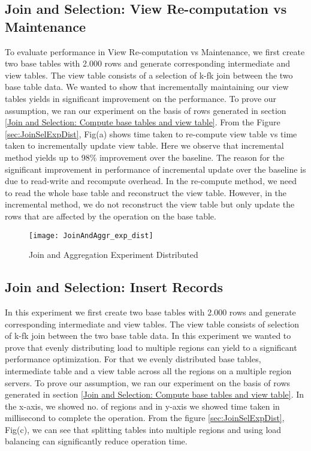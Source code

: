 \documentclass[11pt,a4paper,bibtotoc,idxtotoc,headsepline,footsepline,footexclude,BCOR12mm,DIV13]{scrbook}
\begin{document}
\subsection{Join and Selection: View Re-computation vs Maintenance}
\label{Join and Selection: View Re-computation vs Maintenance Distributed}

To evaluate performance in View Re-computation vs Maintenance, we first create two base tables with 2.000 rows and generate corresponding intermediate and view tables. The view table consists of a selection of k-fk join between the two base table data. We wanted to show that incrementally maintaining our view tables yields in significant improvement on the performance. To prove our assumption, we ran our experiment on the basis of rows generated in section \ref{Join and Selection: Compute base tables and view table}. From the Figure \ref{sec:JoinSelExpDist}, Fig(a) shows time taken to re-compute view table vs time taken to incrementally update view table. Here we observe that incremental method yields up to 98\% improvement over the baseline. The reason for the significant improvement in performance of incremental update over the baseline is due to read-write and recompute overhead. In the re-compute method, we need to read the whole base table and
reconstruct the view table. However, in the incremental method, we do not reconstruct the view table but only update the rows that are affected by the operation on the base table. 

\begin{figure}
	\centering
	\texttt{[image: JoinAndAggr\_exp\_dist]}
	\caption{Join and Aggregation Experiment Distributed}
	\label{sec:JoinAggrExpDist}
	
\end{figure} 
\newpage



\subsection{Join and Selection: Insert Records}
\label{Join and Selection: Insert Records Distributed}

In this experiment we first create two base tables with 2.000 rows and generate corresponding intermediate and view tables. The view table consists of selection of k-fk join between the two base table data. In this experiment we wanted to prove that evenly distributing load to multiple regions can yield to a significant performance optimization. For that we evenly distributed base tables, intermediate table and a view table across all the regions on a multiple region servers.  
To prove our assumption, we ran our experiment on the basis of rows generated in section \ref{Join and Selection: Compute base tables and view table}. In the x-axis, we showed no. of regions and in y-axis we showed time taken in millisecond to complete the operation. From the figure \ref{sec:JoinSelExpDist}, Fig(c), we can see that splitting tables into multiple regions and using load balancing can significantly reduce operation time.
\end{document}
